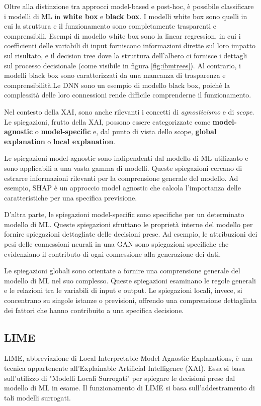 \begin{flushleft}
Oltre alla distinzione tra approcci model-based e post-hoc, è possibile classificare i modelli di ML in \textbf{white box} e \textbf{black box}. I modelli white box sono quelli in cui la struttura e il funzionamento sono completamente trasparenti e comprensibili. Esempi di modello white box sono la linear regression, in cui i coefficienti delle variabili di input forniscono informazioni dirette sul loro impatto sul risultato, e il decision tree dove la struttura dell'albero ci fornisce i dettagli sul processo decisionale (come visibile in figura \ref{fig:ibmtrees}). Al contrario, i modelli black box sono caratterizzati da una mancanza di trasparenza e comprensibilità.Le DNN sono un esempio di modello black box, poiché la complessità delle loro connessioni rende difficile comprenderne il funzionamento.

Nel contesto della XAI, sono anche rilevanti i concetti di \emph{agnosticismo} e di \emph{scope}. Le spiegazioni, frutto della XAI, possono essere categorizzate come \textbf{model-agnostic} o \textbf{model-specific} e, dal punto di vista dello scope,  \textbf{global explanation} o \textbf{local explanation}.

Le spiegazioni model-agnostic sono indipendenti dal modello di ML utilizzato e sono applicabili a una vasta gamma di modelli. Queste spiegazioni cercano di estrarre informazioni  rilevanti per la comprensione generale del modello. Ad esempio, SHAP è un approccio model agnostic che calcola l'importanza delle caratteristiche per una specifica previsione.

D'altra parte, le spiegazioni model-specific sono specifiche per un determinato modello di ML. Queste spiegazioni sfruttano le proprietà interne del modello per fornire spiegazioni dettagliate delle decisioni prese. Ad esempio, le attribuzioni dei pesi delle connessioni neurali in una GAN sono spiegazioni specifiche che evidenziano il contributo di ogni connessione alla generazione dei dati.

Le spiegazioni globali sono orientate a fornire una comprensione generale del modello di ML nel suo complesso. Queste spiegazioni esaminano le regole generali e le relazioni tra le variabili di input e output. Le spiegazioni locali, invece, si concentrano su singole istanze o previsioni, offrendo una comprensione dettagliata dei fattori che hanno contribuito a una specifica decisione.


\subsection{LIME}
LIME, abbreviazione di Local Interpretable Model-Agnostic Explanations, è una tecnica appartenente all'Explainable Artificial Intelligence (XAI). Essa si basa sull'utilizzo di "Modelli Locali Surrogati" per spiegare le decisioni prese dal modello di ML in esame. Il funzionamento di LIME si basa sull'addestramento di tali modelli surrogati.


\end{flushleft}
